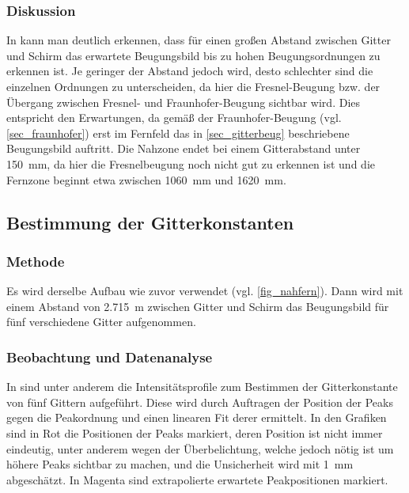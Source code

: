 \documentclass[
	a4paper,
	12pt,
	pagesize,
	ngerman
]{scrartcl}
\begin{document}
	\subsubsection*{Diskussion}
	In  kann man deutlich erkennen, dass für einen großen Abstand zwischen Gitter und Schirm das erwartete Beugungsbild bis zu hohen Beugungsordnungen zu erkennen ist.
	Je geringer der Abstand jedoch wird, desto schlechter sind die einzelnen Ordnungen zu unterscheiden, da hier die Fresnel-Beugung bzw. der Übergang zwischen Fresnel- und Fraunhofer-Beugung sichtbar wird.
	Dies entspricht den Erwartungen, da gemäß der Fraunhofer-Beugung (vgl. \cref{sec_fraunhofer}) erst im Fernfeld das in \cref{sec_gitterbeug} beschriebene Beugungsbild auftritt.
	Die Nahzone endet bei einem Gitterabstand unter \SI{150}{mm}, da hier die Fresnelbeugung noch nicht gut zu erkennen ist und die Fernzone beginnt etwa zwischen \SI{1060}{mm} und \SI{1620}{mm}.

	\subsection{Bestimmung der Gitterkonstanten} \label{ss_2_beug}

	\subsubsection*{Methode}

	Es wird derselbe Aufbau wie zuvor verwendet (vgl. \cref{fig_nahfern}).
	Dann wird mit einem Abstand von \SI{2,715}{m} zwischen Gitter und Schirm das Beugungsbild für fünf verschiedene Gitter aufgenommen.

	\subsubsection*{Beobachtung und Datenanalyse}
 In  sind unter anderem die Intensitätsprofile zum Bestimmen der Gitterkonstante von fünf Gittern aufgeführt.
 Diese wird durch Auftragen der Position der Peaks gegen die Peakordnung und einen linearen Fit derer ermittelt.
 In den Grafiken sind in Rot die Positionen der Peaks markiert, deren Position ist nicht immer eindeutig, unter anderem wegen der Überbelichtung, welche jedoch nötig ist um höhere Peaks sichtbar zu machen, und die Unsicherheit wird mit \SI{1}{mm} abgeschätzt.
 In Magenta sind extrapolierte erwartete Peakpositionen markiert.
\end{document}

